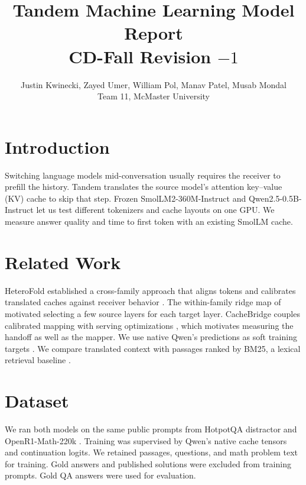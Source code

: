 \documentclass[11pt]{article}
\title{Tandem Machine Learning Model Report\\CD-Fall Revision $-1$}
\author{Justin Kwinecki, Zayed Umer, William Pol, Manav Patel, Musab Mondal\\
  Team 11, McMaster University}
\begin{document}
\maketitle

\section{Introduction}

Switching language models mid-conversation usually requires the
receiver to prefill the history. Tandem translates the source
model's attention key--value (KV) cache to skip that step. Frozen
SmolLM2-360M-Instruct and Qwen2.5-0.5B-Instruct let us test different
tokenizers and cache layouts on one GPU. We measure answer quality and
time to first token with an existing SmolLM cache.

\section{Related Work}

HeteroFold established a cross-family approach that aligns tokens and
calibrates translated caches against receiver behavior \citep{Yun2026}.
The within-family ridge map of \citet{Heo2026} motivated selecting a few
source layers for each target layer. CacheBridge couples calibrated
mapping with serving optimizations \citep{Qu2026}, which motivates
measuring the handoff as well as the mapper. We use native Qwen's
predictions as soft training targets \citep{Hinton2015}. We compare
translated context with passages ranked by BM25, a lexical retrieval
baseline \citep{Robertson2009}.

\section{Dataset}

We ran both models on the same public prompts from HotpotQA distractor
\citep{Yang2018} and OpenR1-Math-220k \citep{OpenR1}. Training was
supervised by Qwen's native cache tensors and continuation logits.
We retained passages, questions, and math problem text for training.
Gold answers and published solutions were excluded from training prompts.
Gold QA answers were used for evaluation.
\end{document}
